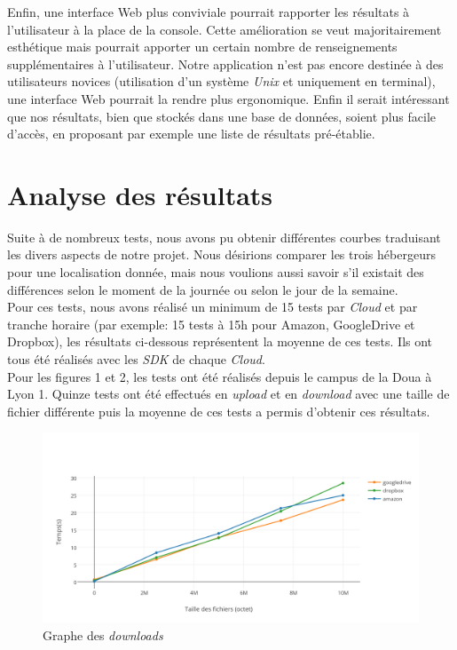 \documentclass[10pt]{article}
\begin{document}
Enfin, une interface Web plus conviviale pourrait rapporter les résultats à
l'utilisateur à la place de la console. Cette amélioration se veut
majoritairement esthétique mais pourrait apporter un certain nombre de
renseignements supplémentaires à l'utilisateur. Notre application n'est pas
encore destinée à des utilisateurs novices (utilisation d'un système
\textit{Unix} et uniquement en terminal), une interface Web pourrait la rendre
plus ergonomique. Enfin il serait intéressant que nos résultats, bien que
stockés dans une base de données, soient plus facile d'accès, en proposant par exemple une liste de résultats pré-établie.


\newpage \section{Analyse des résultats}

Suite à de nombreux tests, nous avons pu obtenir différentes courbes traduisant
les divers aspects de notre projet. Nous désirions comparer les trois
hébergeurs pour une localisation donnée, mais nous voulions aussi savoir s'il
existait des différences selon le moment de la journée ou selon le jour de la
semaine.\\

Pour ces tests, nous avons réalisé un minimum de 15 tests par \textit{Cloud}
et par tranche horaire (par exemple: 15 tests à 15h pour Amazon, GoogleDrive et
Dropbox), les résultats ci-dessous représentent la moyenne de ces tests. Ils
ont tous été réalisés avec les \textit{SDK} de chaque \textit{Cloud}.\\

Pour les figures 1 et 2, les tests ont été réalisés depuis le campus de la Doua
à Lyon 1. Quinze tests ont été effectués en \textit{upload} et en
\textit{download} avec une taille de fichier différente puis la moyenne de ces
tests a permis d'obtenir ces résultats.

\begin{figure}[h] \centering
\includegraphics[scale=0.65]{graphe_des_downloads.png} \caption{Graphe des
\textit{downloads}} \end{figure}
\end{document}
